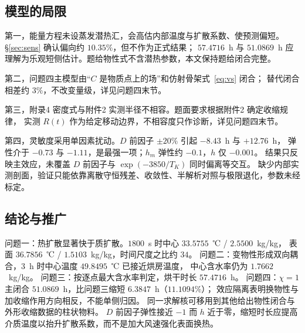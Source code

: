\subsection{模型的局限}

第一，能量方程未设蒸发潜热汇，会高估内部温度与扩散系数、使预测偏短。
§\ref{sec:sens} 确认偏向约 $10.35\%$，但不作为正式结果；
$57.4716$~h 与 $51.0869$~h 应理解为乐观短侧估计。题给物性式不含潜热参数，本文保持题给闭合完整。

第二，问题四主模型由“$C$ 是物质点上的场”和仿射骨架式~\eqref{eq:vs} 闭合；
替代闭合相差约 $3\%$，不改变量级，详见问题四末节。

第三，附录4 密度式与附件2 实测半径不相容。题面要求根据附件2 确定收缩规律，
实测 $R(t)$ 作为给定移动边界，不相容度只作诊断，详见问题四末节。

第四，灵敏度采用单因素扰动。$D$ 前因子 $\pm 20\%$ 引起 $-8.43$~h 与 $+12.76$~h，
弹性介于 $-0.73$ 与 $-1.11$，是最强一项；$h_m$ 弹性约 $-0.1$，$h$ 仅 $-0.001$。
结果只反映主效应，未覆盖 $D$ 前因子与 $\exp(-3850/T_K)$ 同时偏离等交互。
缺少内部实测剖面，验证只能依靠离散守恒残差、收敛性、半解析对照与极限退化，参数未经标定。

\subsection{结论与推广}

问题一：热扩散显著快于质扩散。$1800$~s 时中心 $33.5755$~℃ / $2.5500$~kg/kg，
表面 $36.7856$~℃ / $1.5103$~kg/kg，时间尺度之比约 $34$。
问题二：变物性形成双向耦合，$3$~h 时中心温度 $49.8495$~℃ 已接近烘房温度，
中心含水率仍为 $1.7662$~kg/kg。
问题三：按逐点最大含水率判定，烘干时长 $57.4716$~h。
问题四：$\chi=1$ 主闭合 $51.0869$~h，比问题三缩短 $6.3847$~h（$11.1094\%$）；
效应隔离表明换物性与加收缩作用方向相反，不能单侧归因。
同一求解核可移用到其他给出物性闭合与外形收缩数据的柱状物料。
$D$ 前因子弹性接近 $-1$ 而 $h$ 近于零，缩短时长应提高介质温度以抬升扩散系数，而不是加大风速强化表面换热。

